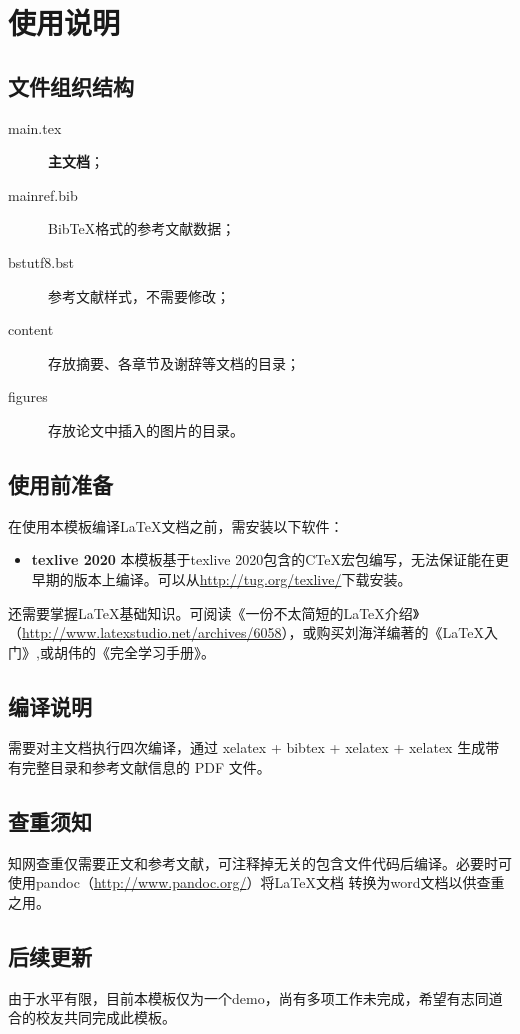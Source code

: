 \chapter{使用说明}


\section{文件组织结构}
\begin{description}
\item[main.tex] \textbf{ 主文档}；
\item[mainref.bib] BibTeX格式的参考文献数据；
\item[bstutf8.bst] 参考文献样式，不需要修改；
\item[content] 存放摘要、各章节及谢辞等文档的目录；
\item[figures] 存放论文中插入的图片的目录。
\end{description}
\section{使用前准备}
在使用本模板编译\LaTeX 文档之前，需安装以下软件：
\begin{itemize}

\item{\bf texlive 2020} 本模板基于texlive 2020包含的CTeX宏包编写，无法保证能在更早期的版本上编译。可以从\url{http://tug.org/texlive/}下载安装。
\end{itemize}

还需要掌握\LaTeX 基础知识。可阅读《一份不太简短的\LaTeX 介绍》（\url{http://www.latexstudio.net/archives/6058}），或购买刘海洋编著的《\LaTeX 入门》,或胡伟的《\LaTeXe 完全学习手册》。

\section{编译说明}
需要对主文档执行四次编译，通过 xelatex + bibtex + xelatex + xelatex 生成带有完整目录和参考文献信息的 PDF 文件。

\section{查重须知}
知网查重仅需要正文和参考文献，可注释掉无关的包含文件代码后编译。必要时可使用pandoc（\url{http://www.pandoc.org/}）将\LaTeX 文档 转换为word文档以供查重之用。

\section{后续更新}
由于水平有限，目前本模板仅为一个demo，尚有多项工作未完成，希望有志同道合的校友共同完成此模板。

